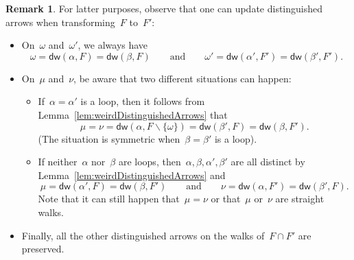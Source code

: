 \documentclass{amsart}
\theoremstyle{definition}
\newtheorem{remark}[theorem]{Remark}
\newcommand{\ssm}{\smallsetminus} %
\newcommand{\distinguishedWalk}[2]{\mathsf{dw}(#1,#2)} %
\begin{document}
\begin{remark}
\label{rem:changeDistinguishedArrows}
For latter purposes, observe that one can update distinguished arrows when transforming~$F$ to~$F'$:
\begin{itemize}
\item On~$\omega$ and~$\omega'$, we always have
\[
\omega = \distinguishedWalk{\alpha}{F} = \distinguishedWalk{\beta}{F}
\qquad\text{and}\qquad
\omega' = \distinguishedWalk{\alpha'}{F'} = \distinguishedWalk{\beta'}{F'}.
\]

\item On~$\mu$ and~$\nu$, be aware that two different situations can happen:
\begin{itemize}
\item If~$\alpha = \alpha'$ is a loop, then it follows from Lemma~\ref{lem:weirdDistinguishedArrows} that
\[
\mu = \nu = \distinguishedWalk{\alpha}{F \ssm \{\omega\}} = \distinguishedWalk{\beta'}{F} = \distinguishedWalk{\beta}{F'}.
\]
(The situation is symmetric when~$\beta = \beta'$ is a loop).
\item If neither~$\alpha$ nor~$\beta$ are loops, then~$\alpha, \beta, \alpha', \beta'$ are all distinct by Lemma~\ref{lem:weirdDistinguishedArrows} and
\[
\mu = \distinguishedWalk{\alpha'}{F} = \distinguishedWalk{\beta}{F'}
\qquad\text{and}\qquad
\nu = \distinguishedWalk{\alpha}{F'} = \distinguishedWalk{\beta'}{F}.
\]
Note that it can still happen that~$\mu = \nu$ or that~$\mu$ or~$\nu$ are straight walks.
\end{itemize}
\item Finally, all the other distinguished arrows on the walks of~$F \cap F'$ are preserved.
\end{itemize}

\end{remark}
\end{document}
